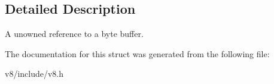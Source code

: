 \subsection{Detailed Description}
A unowned reference to a byte buffer. 

The documentation for this struct was generated from the following file\+:\begin{DoxyCompactItemize}
\item 
v8/include/v8.\+h\end{DoxyCompactItemize}
